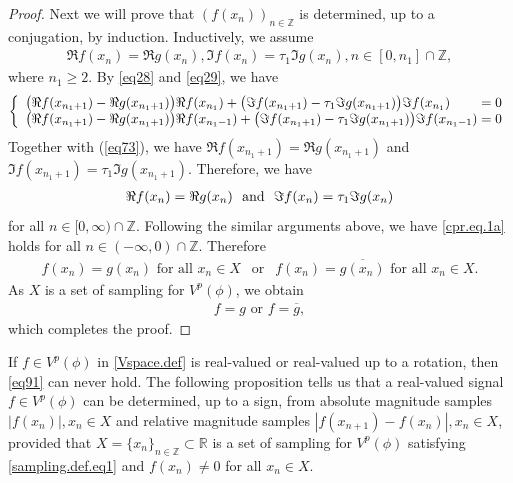 \documentclass[12pt,oneside,reqno]{amsart}
\newcommand{\Z}{\mathbb{Z}}
\newcommand{\R}{\mathbb{R}}
\numberwithin{equation}{section}
\begin{document}
\begin{proof}
	Next we will prove that $(f(x_n))_{n\in \Z}$ is determined, up to a conjugation, 
	by induction.
	Inductively, we assume
	\begin{align*}
		\Re f(x_n) = \Re g(x_n), \Im f(x_n) = \tau_1 \Im  g(x_n),  n\in [0,n_1]\cap \Z,
	\end{align*}
	where $n_1\ge 2$.
	By \eqref{eq28} and \eqref{eq29},  we have
	\begin{equation*}
		\left\{ \hskip .2in \begin{array}{ll}
			\hskip-.2in
			\big( \Re f(  x_{n_1+1}  )  -  \Re g(  x_{n_1+1}  ) \big)  \Re f(x_{n_1}) + \big(  \Im f(  x_{n_1+1}  )  -  \tau_1 \Im g(  x_{n_1+1}) \big)  \Im f(x_{n_1}  ) {}& \hskip-.10in =  0 \\
			\hskip-.2in
			\big( \Re f(  x_{n_1+1}  )  -  \Re g(  x_{n_1+1}  ) \big)  \Re f(x_{n_1-1}  ) 
			+   \big( \Im  f(  x_{n_1+1}  )  -  \tau_1 \Im g(  x_{n_1+1}  )  \big)  \Im  f(  x_{n_1-1}  ) {}& \hskip-.10in =   0	
		\end{array}\right.
	\end{equation*}
	Together with (\ref{eq73}), we have $\Re f(x_{n_1+1}) = \Re g(x_{n_1+1}) $ and $\Im  f(x_{n_1+1}) = \tau_1 \Im g(x_{n_1+1})$. 
	Therefore, we have 
	\begin{align}\label{cpr.eq.1a}
		\Re f(x_n) = \Re g(x_n) \ \ {\rm and} \ \ \Im f(x_n) = \tau_1 \Im  g(x_n)
	\end{align}
	for all $n\in [0,\infty)\cap \Z$. Following the similar arguments above, we  have \eqref{cpr.eq.1a}  holds for all $n\in (-\infty, 0)\cap \Z$. Therefore 
	\begin{align*}
		f(x_n)=g(x_n) \text{ for all } x_n\in X  \ \ \text{ or }  \ \ f(x_n)=\overline{g(x_n)} \text{ for all } x_n\in X.
	\end{align*}
	As $X$ is a set of sampling for $V^p(\phi)$, we obtain
	\begin{align*}
		f=g \text{ or } f=\overline{g},
	\end{align*}
	which completes the proof.
\end{proof}











If $f\in V^p(\phi)$ in \eqref{Vspace.def} is real-valued or real-valued up to a rotation, then \eqref{eq91} can never hold. The following proposition tells us that  a real-valued signal $f\in V^p(\phi)$ can be determined, up to a sign,  from absolute magnitude samples $ |f(x_n)|, x_n\in X$ and relative magnitude samples $|f(x_{n+1})-f(x_n)|, x_n\in X$, provided that  $X=\{x_n\}_{n\in \Z} \subset \R$ is a set of sampling for $V^p(\phi)$ satisfying \eqref{sampling.def.eq1} and   $f(x_n)\ne 0$ for all $x_n\in X$.
\end{document}
